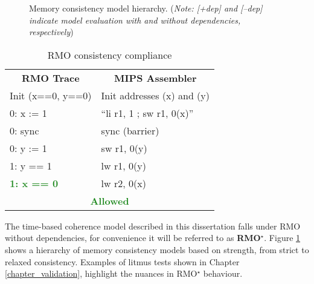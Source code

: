 			\begin{figure}[t]
				\centering 
					\caption[Memory consistency model hierarchy]{Memory consistency model hierarchy. (\textit{Note: [+dep] and [--dep] indicate model evaluation with and without dependencies, respectively})} 
					\label{consistency_sets}
			\end{figure}
	
			\captionsetup[table]{name=Trace}
			\begin{table}[b]
			\begin{center}
			\selectfont
			\begin{tabular}{|l|l|}
				\hline
				\multicolumn{1}{|c|}{\textbf{RMO Trace}} & \multicolumn{1}{c|}{\textbf{MIPS Assembler}} \\
				Init (x==0, y==0) & Init addresses (x) and (y) \\
				\hline
				0: x := 1 & ``li r1, 1 ; sw r1, 0(x)'' \\
				0: sync & sync (barrier) \\
				0: y := 1 & sw r1, 0(y) \\
				1: y == 1 & lw r1, 0(y) \\
				\textbf{\textcolor{ForestGreen}{1: x == 0}} & lw r2, 0(x) \\
				\hline
				\multicolumn{2}{|c|}{\textbf{\textcolor{ForestGreen}{Allowed}}} \\
				\hline
			\end{tabular}
			\caption{RMO consistency compliance}
			\label{rmo_compliance}
			\end{center} 
			\end{table}
			\captionsetup[table]{name=Table}
	
			The time-based coherence model described in this dissertation falls under RMO without dependencies, for convenience it will be referred to as \textbf{RMO{\large$^\star$}}. Figure \ref{consistency_sets} shows a hierarchy of memory consistency models based on strength, from strict to relaxed consistency. Examples of litmus tests shown in Chapter \ref{chapter_validation}, highlight the nuances in RMO{\large$^\star$} behaviour. 
			
